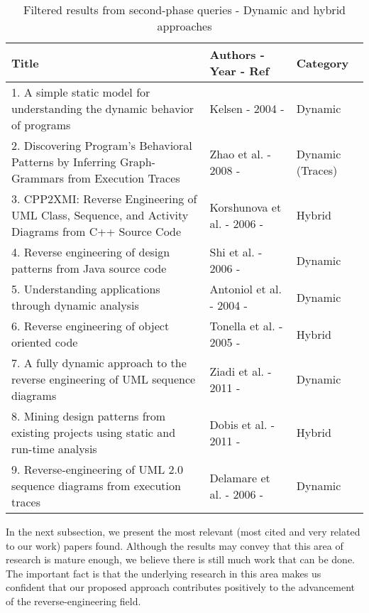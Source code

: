 \begin{table}[h]
\caption{Filtered results from second-phase queries - Dynamic and hybrid approaches}
\label{table:relatedPapers2}
\centering
\begin{tabular}{p{6cm}|p{5cm}|p{3cm}}
\toprule
\rowcolor[HTML]{BBDAFF}
\textbf{Title}  & \textbf{Authors - Year - Ref} & \textbf{Category} \\ \midrule
1. A simple static model for understanding the dynamic behavior of programs & Kelsen - 2004 - \cite{Kelsen2004} & Dynamic 
\\ \hline
2. Discovering Program's Behavioral Patterns by Inferring Graph-Grammars from Execution Traces &  Zhao et al. - 2008 - \cite{Zhao2008}& Dynamic (Traces)
\\ \hline
3. CPP2XMI: Reverse Engineering of UML Class, Sequence, and Activity Diagrams from C++ Source Code & Korshunova et al. - 2006 - \cite{cpp2xmi} & Hybrid
\\ \hline
4. Reverse engineering of design patterns from Java source code & Shi et al. - 2006 - \cite{4019568} & Dynamic
\\ \hline
5. Understanding applications through dynamic analysis & Antoniol et al. - 2004 - \cite{Penta2004Web} & Dynamic \\ \hline
6. Reverse engineering of object oriented code & Tonella et al. - 2005 - \cite{1553682} & Hybrid
 \\ \hline
7. A fully dynamic approach to the reverse engineering of UML sequence diagrams & Ziadi et al. -  2011 - \cite{5773385} & Dynamic
\\ \hline
8. Mining design patterns from existing projects using static and run-time analysis & Dobis et al. - 2011 - \cite{Huzar2011} & Hybrid
\\ \hline
9. Reverse-engineering of UML 2.0 sequence diagrams from execution traces & Delamare et al. - 2006 - \cite{Delamare06} &  Dynamic
\\ \bottomrule
\end{tabular}
\end{table}

In the next subsection, we present the most relevant (most cited and very related to our work) papers found. 
Although the results may convey that this area of research is mature enough, we believe there is still much work that can be done. The important fact is that the underlying research in this area makes us confident that our proposed approach contributes positively to the advancement of the reverse-engineering field.

